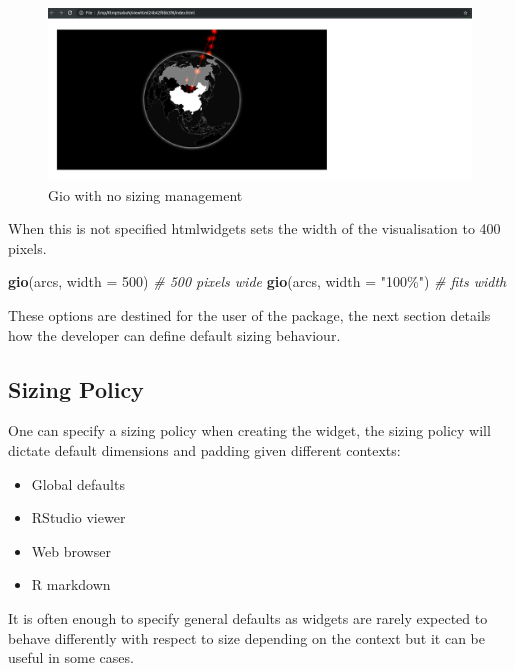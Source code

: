 \documentclass[
]{krantz}
\makeatletter
\newenvironment{Shaded}{\begin{snugshade}}{\end{snugshade}}
\newcommand{\CommentTok}[1]{\textcolor[rgb]{0.37,0.37,0.37}{\textit{#1}}}
\newcommand{\DataTypeTok}[1]{\textcolor[rgb]{0.27,0.27,0.27}{#1}}
\newcommand{\DecValTok}[1]{\textcolor[rgb]{0.06,0.06,0.06}{#1}}
\newcommand{\KeywordTok}[1]{\textcolor[rgb]{0.27,0.27,0.27}{\textbf{#1}}}
\newcommand{\NormalTok}[1]{#1}
\newcommand{\StringTok}[1]{\textcolor[rgb]{0.5,0.5,0.5}{#1}}
\providecommand{\tightlist}{%
  \setlength{\itemsep}{0pt}\setlength{\parskip}{0pt}}
\newenvironment{kframe}{%
\medskip{}
\setlength{\fboxsep}{.8em}
 \def\at@end@of@kframe{}%
 \ifinner\ifhmode%
  \def\at@end@of@kframe{\end{minipage}}%
  \begin{minipage}{\columnwidth}%
 \fi\fi%
 \def\FrameCommand##1{\hskip\@totalleftmargin \hskip-\fboxsep
 \colorbox{shadecolor}{##1}\hskip-\fboxsep
     \hskip-\linewidth \hskip-\@totalleftmargin \hskip\columnwidth}%
 \MakeFramed {\advance\hsize-\width
   \@totalleftmargin\z@ \linewidth\hsize
   \@setminipage}}%
 {\par\unskip\endMakeFramed%
 \at@end@of@kframe}
\renewenvironment{Shaded}{\begin{kframe}}{\end{kframe}}
\makeatother
\begin{document}
\begin{figure}
\centering
\includegraphics{images/gio-size-issue.png}
\caption{Gio with no sizing management}
\end{figure}

When this is not specified htmlwidgets sets the width of the visualisation to 400 pixels.

\begin{Shaded}
\begin{Highlighting}[]
\KeywordTok{gio}\NormalTok{(arcs, }\DataTypeTok{width =} \DecValTok{500}\NormalTok{) }\CommentTok{\# 500 pixels wide}
\KeywordTok{gio}\NormalTok{(arcs, }\DataTypeTok{width =} \StringTok{"100\%"}\NormalTok{) }\CommentTok{\# fits width}
\end{Highlighting}
\end{Shaded}

These options are destined for the user of the package, the next section details how the developer can define default sizing behaviour.

\hypertarget{sizing-policy}{%
\subsection{Sizing Policy}\label{sizing-policy}}

One can specify a sizing policy when creating the widget, the sizing policy will dictate default dimensions and padding given different contexts:

\begin{itemize}
\tightlist
\item
  Global defaults
\item
  RStudio viewer
\item
  Web browser
\item
  R markdown
\end{itemize}

It is often enough to specify general defaults as widgets are rarely expected to behave differently with respect to size depending on the context but it can be useful in some cases.
\end{document}
